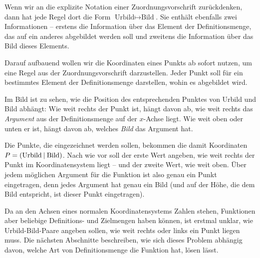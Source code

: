\documentclass[../../main.tex]{subfiles}
\begin{document}
Wenn wir an die explizite Notation einer Zuordnungsvorschrift zurückdenken, dann hat jede Regel dort die Form $\text{Urbild}\mapsto\text{Bild}$. Sie enthält ebenfalls zwei Informationen -- erstens die Information über das Element der Definitionsmenge, das auf ein anderes abgebildet werden soll und zweitens die Information über das Bild dieses Elements.

Darauf aufbauend wollen wir die Koordinaten eines Punkts ab sofort nutzen, um eine Regel aus der Zuordnungsvorschrift darzustellen. Jeder Punkt soll für ein bestimmtes Element der Definitionsmenge darstellen, wohin es abgebildet wird.


Im Bild ist zu sehen, wie die Position des entsprechenden Punktes von Urbild und Bild abhängt: Wie weit rechts der Punkt ist, hängt davon ab, wie weit rechts das \emph{Argument} aus der Definitionsmenge auf der $x$-Achse liegt. Wie weit oben oder unten er ist, hängt davon ab, welches \emph{Bild} das Argument hat.

Die Punkte, die eingezeichnet werden sollen, bekommen die damit Koordinaten $P=\left(\text{Urbild} \:\middle|\: \text{Bild}\right)$. Nach wie vor soll der erste Wert angeben, wie weit rechts der Punkt im Koordinatensystem liegt -- und der zweite Wert, wie weit oben.
Über jedem möglichen Argument für die Funktion ist also genau ein Punkt eingetragen, denn jedes Argument hat genau ein Bild (und auf der Höhe, die dem Bild entspricht, ist dieser Punkt eingetragen).

Da an den Achsen eines normalen Koordinatensystems Zahlen stehen, Funktionen aber beliebige Definitions- und Zielmengen haben können, ist erstmal unklar, wie Urbild-Bild-Paare angeben sollen, wie weit rechts oder links ein Punkt liegen muss. Die nächsten Abschnitte beschreiben, wie sich dieses Problem abhängig davon, welche Art von Definitionsmenge die Funktion hat, lösen lässt.
\end{document}
